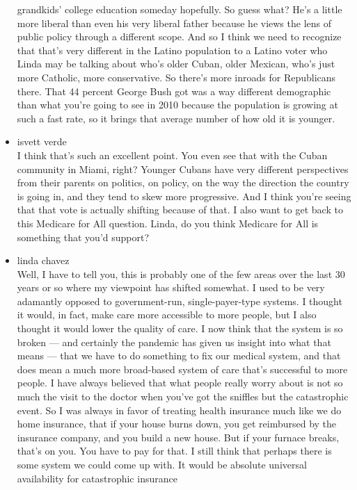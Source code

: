 \begin{itemize}
  grandkids' college education someday hopefully. So guess what? He's a
  little more liberal than even his very liberal father because he views
  the lens of public policy through a different scope. And so I think we
  need to recognize that that's very different in the Latino population
  to a Latino voter who Linda may be talking about who's older Cuban,
  older Mexican, who's just more Catholic, more conservative. So there's
  more inroads for Republicans there. That 44 percent George Bush got
  was a way different demographic than what you're going to see in 2010
  because the population is growing at such a fast rate, so it brings
  that average number of how old it is younger.
\item
  isvett verde\\
  I think that's such an excellent point. You even see that with the
  Cuban community in Miami, right? Younger Cubans have very different
  perspectives from their parents on politics, on policy, on the way the
  direction the country is going in, and they tend to skew more
  progressive. And I think you're seeing that that vote is actually
  shifting because of that. I also want to get back to this Medicare for
  All question. Linda, do you think Medicare for All is something that
  you'd support?
\item
  linda chavez\\
  Well, I have to tell you, this is probably one of the few areas over
  the last 30 years or so where my viewpoint has shifted somewhat. I
  used to be very adamantly opposed to government-run, single-payer-type
  systems. I thought it would, in fact, make care more accessible to
  more people, but I also thought it would lower the quality of care. I
  now think that the system is so broken --- and certainly the pandemic
  has given us insight into what that means --- that we have to do
  something to fix our medical system, and that does mean a much more
  broad-based system of care that's successful to more people. I have
  always believed that what people really worry about is not so much the
  visit to the doctor when you've got the sniffles but the catastrophic
  event. So I was always in favor of treating health insurance much like
  we do home insurance, that if your house burns down, you get
  reimbursed by the insurance company, and you build a new house. But if
  your furnace breaks, that's on you. You have to pay for that. I still
  think that perhaps there is some system we could come up with. It
  would be absolute universal availability for catastrophic insurance

\end{itemize}
